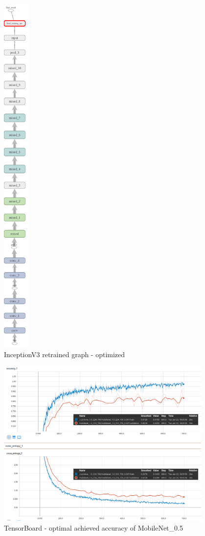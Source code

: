\begin{figure}[htbp]
\centering
\includegraphics[height=18.5cm]{includes/graphInception4000Opt4}
\caption{InceptionV3 retrained graph - optimized}
\label{fig:InceptionV3 retrained graph - optimized}
\end{figure}
\newpage

\begin{figure}[htbp]
\centering
\includegraphics[width=0.95\textwidth]{includes/MobileNet05-700res}
\caption{TensorBoard - optimal achieved accuracy of MobileNet_0.5}
\label{fig:MobileNet05-700res}
\end{figure}

